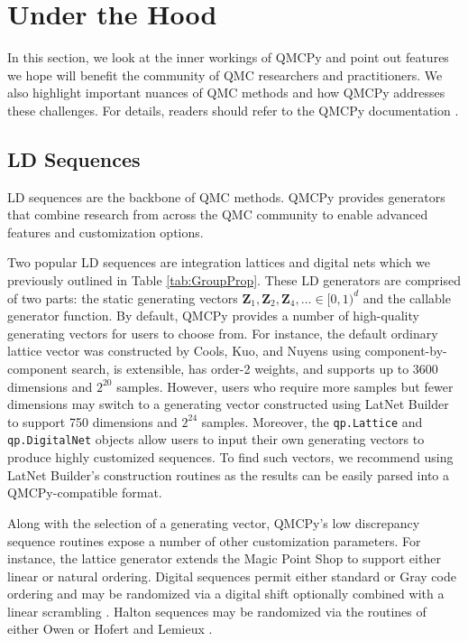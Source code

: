 \documentclass[graybox]{svmult}
\begin{document}
\section{Under the Hood}

In this section, we look at the inner workings of QMCPy and point out features we hope will benefit the community of QMC researchers and practitioners. We also highlight important nuances of QMC methods and how QMCPy addresses these challenges. For details, readers should refer to the QMCPy documentation \cite{QMCPyDocs}.

\subsection{LD Sequences}

LD sequences are the backbone of QMC methods. QMCPy provides generators that combine research from across the QMC community to enable advanced features and customization options.

Two popular LD sequences are integration lattices and digital nets which we previously outlined in Table \ref{tab:GroupProp}. These LD generators are comprised of two parts: the static generating vectors $\boldsymbol{Z}_1,\boldsymbol{Z}_2,\boldsymbol{Z}_4, \ldots \in [0,1)^d$ and the callable generator function. By default, QMCPy provides a number of high-quality generating vectors for users to choose from. For instance, the default ordinary lattice vector was constructed by Cools, Kuo, and Nuyens \cite{doi:10.1137/06065074X} using component-by-component search, is extensible, has order-2 weights, and supports up to 3600 dimensions and $2^{20}$ samples. 
However, users who require more samples but fewer dimensions may switch to a generating vector constructed using LatNet Builder \cite{LatNet,LEcEtal22a} to support 750 dimensions and $2^{24}$ samples. Moreover, the \texttt{qp.Lattice} and \texttt{qp.DigitalNet} objects allow users to input their own generating vectors to produce highly customized sequences. To find such vectors, we recommend using LatNet Builder's construction routines as the results can be easily parsed into a QMCPy-compatible format. 

Along with the selection of a generating vector, QMCPy's low discrepancy sequence routines expose a number of other customization parameters. For instance, the lattice generator extends the Magic Point Shop \cite{Nuy17a} to support either linear or natural ordering. Digital sequences permit either standard or Gray code ordering and may be randomized via a digital shift optionally combined with a linear scrambling \cite{Mat98}. Halton sequences may be randomized via the routines of either Owen \cite{Owe20a} or Hofert and Lemieux \cite{QRNG2020}. 
\end{document}

